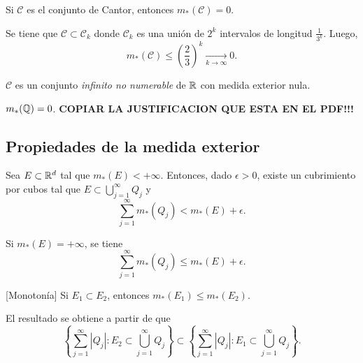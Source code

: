     \begin{ejemplo}{}
    Si $\mathscr{C}$ es el conjunto de Cantor, entonces $m_{*}(\mathscr{C})=0$.
    \begin{demo}
    Se tiene que $\mathscr{C}\subset \mathscr{C}_k$ donde $\mathscr{C}_k$ es una uni\'on de $2^k$ intervalos de longitud $\frac{1}{3^k}$. 
    Luego, 
    \[
    m_{*}(\mathscr{C})\leq \left(\frac{2}{3}\right)^k \xrightarrow[k \to \infty]{}0.
    \]
    \end{demo}
    $\mathscr{C}$ es un  conjunto \emph{infinito no numerable} de $\mathbb{R}$     con medida exterior nula.
    \end{ejemplo}
    
    \begin{ejemplo}{}
    $m_{*}(\mathbb{Q})=0$.
    \textbf{COPIAR LA JUSTIFICACION QUE ESTA EN EL PDF!!!}
    \end{ejemplo}
    
    \subsection{Propiedades de la medida exterior}
    
    \begin{observacion}{}
    Sea $E \subset \mathbb{R}^d$ tal que  $m_*(E)<+\infty$. 
    Entonces, dado $\epsilon>0$, existe un cubrimiento por cubos  tal que $E \subset \bigcup\limits_{j=1}^{\infty} Q_j$ y 
    \[
    \sum\limits_{j=1}^{\infty} m_{*}(Q_j)< m_{*}(E)+\epsilon.
    \]

    Si $m_{*}(E)=+\infty$, se tiene
    \[
    \sum\limits_{j=1}^{\infty} m_{*}(Q_j)\leq m_{*}(E)+\epsilon.
    \]
    \end{observacion}
        
    \begin{observacion}{}[Monoton\'ia]
    Si $E_1\subset E_2$, entonces $m_{*}(E_1)\leq m_{*}(E_2)$.
    
    El resultado se obtiene a partir de que 
    \[
   \left \{ \sum\limits_{j=1}^{\infty} |Q_j|: E_2\subset \bigcup\limits_{j=1}^{\infty} Q_j
    \right\}
    \subset
     \left\{ \sum\limits_{j=1}^{\infty} |Q_j|: E_1\subset \bigcup\limits_{j=1}^{\infty} Q_j
    \right\}.
    \]
    \end{observacion}
    
